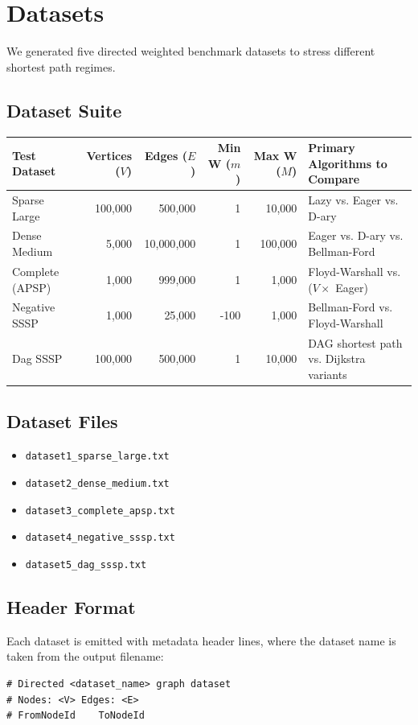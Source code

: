 \section{Datasets}

We generated five directed weighted benchmark datasets to stress different shortest path regimes.

\subsection{Dataset Suite}
\begin{center}
\begin{tabular}{|l|r|r|r|r|l|}
\hline
\textbf{Test Dataset} & \textbf{Vertices ($V$)} & \textbf{Edges ($E$)} & \textbf{Min W ($m$)} & \textbf{Max W ($M$)} & \textbf{Primary Algorithms to Compare} \\
\hline
Sparse Large & 100{,}000 & 500{,}000 & 1 & 10{,}000 & Lazy vs. Eager vs. D-ary \\
\hline
Dense Medium & 5{,}000 & 10{,}000{,}000 & 1 & 100{,}000 & Eager vs. D-ary vs. Bellman-Ford \\
\hline
Complete (APSP) & 1{,}000 & 999{,}000 & 1 & 1{,}000 & Floyd-Warshall vs. ($V \times$ Eager) \\
\hline
Negative SSSP & 1{,}000 & 25{,}000 & -100 & 1{,}000 & Bellman-Ford vs. Floyd-Warshall \\
\hline
Dag SSSP & 100{,}000 & 500{,}000 & 1 & 10{,}000 & DAG shortest path vs. Dijkstra variants \\
\hline
\end{tabular}
\end{center}

\subsection{Dataset Files}
\begin{itemize}
	\item \texttt{dataset1\_sparse\_large.txt}
	\item \texttt{dataset2\_dense\_medium.txt}
	\item \texttt{dataset3\_complete\_apsp.txt}
	\item \texttt{dataset4\_negative\_sssp.txt}
	\item \texttt{dataset5\_dag\_sssp.txt}
\end{itemize}

\subsection{Header Format}
Each dataset is emitted with metadata header lines, where the dataset name is taken from the output filename:
\begin{verbatim}
# Directed <dataset_name> graph dataset
# Nodes: <V> Edges: <E>
# FromNodeId    ToNodeId
\end{verbatim}

